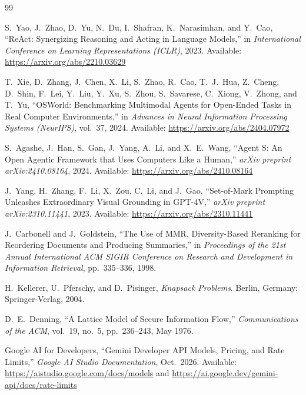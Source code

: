 \documentclass[10pt,a4paper]{article}
\begin{document}
\begin{thebibliography}{99}\setlength{\itemsep}{3pt}\setlength{\parskip}{0pt}\small

S.~Yao, J.~Zhao, D.~Yu, N.~Du, I.~Shafran, K.~Narasimhan, and Y.~Cao,
``ReAct: Synergizing Reasoning and Acting in Language Models,''
in \textit{International Conference on Learning Representations (ICLR)}, 2023.
Available: \href{https://arxiv.org/abs/2210.03629}{https://arxiv.org/abs/2210.03629}

T.~Xie, D.~Zhang, J.~Chen, X.~Li, S.~Zhao, R.~Cao, T.~J.~Hua, Z.~Cheng, D.~Shin, F.~Lei, Y.~Liu, Y.~Xu, S.~Zhou, S.~Savarese, C.~Xiong, V.~Zhong, and T.~Yu,
``OSWorld: Benchmarking Multimodal Agents for Open-Ended Tasks in Real Computer Environments,''
in \textit{Advances in Neural Information Processing Systems (NeurIPS)}, vol.~37, 2024.
Available: \href{https://arxiv.org/abs/2404.07972}{https://arxiv.org/abs/2404.07972}

S.~Agashe, J.~Han, S.~Gan, J.~Yang, A.~Li, and X.~E.~Wang,
``Agent S: An Open Agentic Framework that Uses Computers Like a Human,''
\textit{arXiv preprint arXiv:2410.08164}, 2024.
Available: \href{https://arxiv.org/abs/2410.08164}{https://arxiv.org/abs/2410.08164}

J.~Yang, H.~Zhang, F.~Li, X.~Zou, C.~Li, and J.~Gao,
``Set-of-Mark Prompting Unleashes Extraordinary Visual Grounding in GPT-4V,''
\textit{arXiv preprint arXiv:2310.11441}, 2023.
Available: \href{https://arxiv.org/abs/2310.11441}{https://arxiv.org/abs/2310.11441}

J.~Carbonell and J.~Goldstein,
``The Use of MMR, Diversity-Based Reranking for Reordering Documents and Producing Summaries,''
in \textit{Proceedings of the 21st Annual International ACM SIGIR Conference on Research and Development in Information Retrieval}, pp.~335--336, 1998.

H.~Kellerer, U.~Pferschy, and D.~Pisinger,
\textit{Knapsack Problems}. Berlin, Germany: Springer-Verlag, 2004.

D.~E.~Denning,
``A Lattice Model of Secure Information Flow,''
\textit{Communications of the ACM}, vol.~19, no.~5, pp.~236--243, May 1976.

Google AI for Developers,
``Gemini Developer API Models, Pricing, and Rate Limits,''
\textit{Google AI Studio Documentation}, Oct.~2026.
Available: \href{https://aistudio.google.com/docs/models}{https://aistudio.google.com/docs/models} and \href{https://ai.google.dev/gemini-api/docs/rate-limits}{https://ai.google.dev/gemini-api/docs/rate-limits}

\end{thebibliography}
\end{document}
